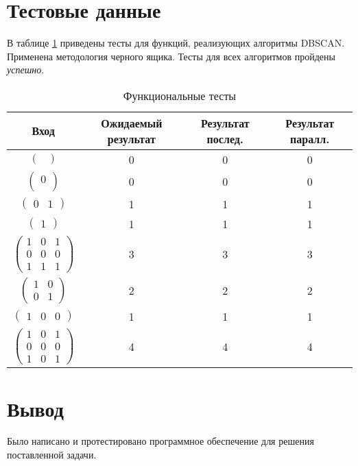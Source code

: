 \section{Тестовые данные}

В таблице \ref{tbl:functional_test} приведены тесты для функций, реализующих алгоритмы DBSCAN. Применена методология черного ящика. Тесты для всех алгоритмов пройдены \textit{успешно}.


\begin{table}[ht!]
	\begin{center}
		\captionsetup{justification=raggedright,singlelinecheck=off}
		\caption{\label{tbl:functional_test} Функциональные тесты}
		\begin{tabular}{|c|c|c|c|}
			\hline
			Вход & Ожидаемый результат & Результат послед. & Результат паралл. 
			\\ \hline
			$\begin{pmatrix}
				\\
			\end{pmatrix}$ &
			0&
			0 & 0
			
			\\ \hline
			$\begin{pmatrix}
			0\\
			\end{pmatrix}$ &
			0 &
			0 & 0
			
			\\ \hline
			$\begin{pmatrix}
				0 & 1
			\end{pmatrix}$ &
			1 &
			1 & 1
			
			\\ \hline
			$\begin{pmatrix}
				1
			\end{pmatrix}$ &
			1 &
			1 & 1
			
			\\ \hline
			$\begin{pmatrix}
				1 & 0 & 1\\
				0 & 0 & 0\\
				1 & 1 & 1
			\end{pmatrix}$ &
			3 &
			3 &3
			
			\\ \hline
			$\begin{pmatrix}
				1 & 0 \\
				0 & 1 
			\end{pmatrix}$ &
			2 &
			2 & 2               
			
			\\ \hline
			$\begin{pmatrix}
				1 & 0 & 0
			\end{pmatrix}$ &
			1&
			1 & 1
			
			\\ \hline
			$\begin{pmatrix}
				1 & 0 & 1 \\
				0 & 0 & 0 \\
				1 & 0 & 1
			\end{pmatrix}$ &
			4 &
			4  & 4                
			\\ \hline
		\end{tabular}
	\end{center}
\end{table}

\section*{Вывод}
Было написано и протестировано программное обеспечение для решения поставленной задачи.